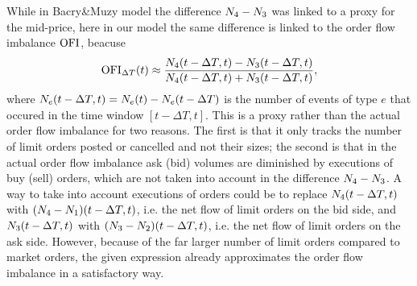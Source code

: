 \documentclass[10pt]{article}
\begin{document}
While in Bacry\&Muzy model the difference $\countingProc[4] - \countingProc[3]$ was linked to a proxy for the mid-price, here in our model the same difference is linked to the order flow imbalance $\orderFlowImbalance$, beacuse 
\begin{equation*}
 \orderFlowImbalance_{\Delta T}(t) \approx  \frac{\countingProc[4](t-\Delta T,t)-\countingProc[3](t-\Delta T,t)}{\countingProc[4](t-\Delta T,t) + \countingProc[3](t-\Delta T,t)},
\end{equation*}
where $\countingProc(t-\Delta T, t) = \countingProc(t) - \countingProc(t-\Delta T)$ is the number of  events of type $e$ that occured in the time window $[t-\Delta T, t]$. This is a proxy rather than the actual order flow imbalance for two reasons. The first is that it only tracks the number of limit orders posted or cancelled and not their sizes; the second is that  in the actual order flow imbalance ask (bid) volumes are diminished by executions of buy (sell) orders, which are not taken into account in the difference $\countingProc[4] - \countingProc[3]$. A way to take into account executions of orders could be to replace $\countingProc[4](t-\Delta T, t)$ with $(\countingProc[4]-\countingProc[1])(t-\Delta T, t)$, i.e.  the net flow of limit orders on the bid side, and $\countingProc[3](t-\Delta T, t)$ with $(\countingProc[3]-\countingProc[2])(t-\Delta T, t)$, i.e.  the net flow of limit orders on the ask side. However, because of the far larger number of limit orders compared to market orders, the given expression already approximates the order flow imbalance in a satisfactory way. 
\end{document}
